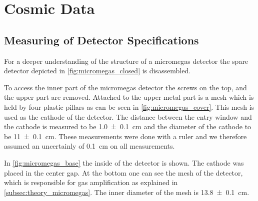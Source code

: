 \documentclass[sn-mathphys-num,iicol]{sn-jnl}
\theoremstyle{thmstyleone}
\theoremstyle{thmstyletwo}
\theoremstyle{thmstylethree}
\begin{document}

\section{Cosmic Data}
\subsection{Measuring of Detector Specifications} \label{subsec:detector_specific} %
For a deeper understanding of the structure of a micromegas detector the spare detector depicted in \autoref{fig:micromegas_closed} is disassembled.


To access the inner part of the micromegas detector the screws on the top, and the upper part are removed.
Attached to the upper metal part is a mesh which is held by four plastic pillars as can be seen in \autoref{fig:micromegas_cover}.
This mesh is used as the cathode of the detector. 
The distance between the entry window and the cathode is measured to be \SI{1.0\pm.1}{\centi\meter} and the diameter of the cathode to be \SI{11\pm.1}{\centi\meter}.
These measurements were done with a ruler and we therefore assumed an uncertainly of \SI{.1}{\centi\meter} on all measurements.


In \autoref{fig:micromegas_base} the inside of the detector is shown. 
The cathode was placed in the center gap.
At the bottom one can see the mesh of the detector, which is responsible for gas amplification as explained in \autoref{subsec:theory_micromegas}.
The inner diameter of the mesh is \SI{13.8\pm.1}{\centi\meter}.

\end{document}
